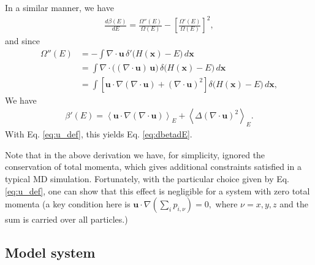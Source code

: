 \documentclass[reprint]{revtex4-1}
\begin{document}
In a similar manner, we have
%
\begin{align*}
  \frac
  {
    d \beta(E)
  }
  {
    d E
  }
  =
  \frac
  {
    \Omega''(E)
  }
  {
    \Omega(E)
  }
  -
  \left[
    \frac
    {
      \Omega'(E)
    }
    {
      \Omega(E)
    }
  \right]^2
  ,
\end{align*}
%
and since
%
\begin{align*}
  \Omega''(E)
  &= -\int \nabla \cdot \mathbf u \,
     \delta'\bigl( H(\mathbf x) - E \bigr) \, d\mathbf x
  \\
  &= \int
     \nabla \cdot \bigl( (\nabla \cdot \mathbf u) \, \mathbf u \bigr) \,
     \delta\bigl( H(\mathbf x) - E \bigr) \, d\mathbf x
  \\
  &= \int
     \left[
     \mathbf u \cdot \nabla (\nabla \cdot \mathbf u)
     +
     (\nabla \cdot \mathbf u)^2
     \right]
     \delta\bigl( H(\mathbf x) - E \bigr) \, d\mathbf x
  ,
\end{align*}
%
We have
%
\begin{align*}
  \beta'(E)
  =
  \left\langle
     \mathbf u \cdot \nabla (\nabla \cdot \mathbf u)
  \right\rangle_E
  +
  \left\langle
    \Delta (\nabla \cdot \mathbf u)^2
  \right\rangle_E
  .
\end{align*}
%
With Eq. \eqref{eq:u_def},
this yields Eq. \eqref{eq:dbetadE}.

Note that in the above derivation
we have, for simplicity, ignored the conservation
of total momenta\cite{shirts2006, uline2008},
which gives additional constraints satisfied in a typical MD simulation.
%
Fortunately, with the particular choice given by Eq. \eqref{eq:u_def},
one can show that this effect is negligible for a system
with zero total momenta\cite{uline2008}
(a key condition here is
$
\mathbf u \cdot \nabla
\left(
  \sum_i p_{i,\nu}
\right) = 0,
$
where $\nu = x, y, z$
and the sum is carried over all particles.)


\subsection{Model system}
\end{document}
